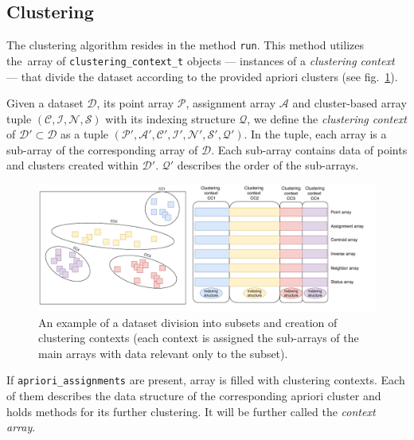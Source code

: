 \subsection{Clustering}
The clustering algorithm resides in the method \texttt{run}. This method utilizes the~array of \texttt{clustering\_context\_t} objects --- instances of a \emph{clustering context} --- that divide the dataset according to the provided apriori clusters (see fig.~\ref{fig03:clust_ctx}).

\begin{defn}
	Given a dataset $\mathcal{D}$, its point array $\mathcal{P}$, assignment array $\mathcal{A}$ and cluster-based array tuple $(\mathcal{C},\mathcal{I},\mathcal{N},\mathcal{S})$ with its indexing structure $\mathcal{Q}$, we define the \emph{clustering context} of $\mathcal{D}' \subset \mathcal{D}$ as a tuple $(\mathcal{P'},\mathcal{A'},\mathcal{C'},\mathcal{I'},\mathcal{N'},\mathcal{S'},\mathcal{Q}')$. In the tuple, each array is a sub-array of the corresponding array of $\mathcal{D}$. Each sub-array contains data of points and clusters created within $\mathcal{D}'$. $\mathcal{Q}'$ describes the order of the sub-arrays.
	\label{def03:context}
\end{defn}

\begin{figure}\centering
	\includegraphics[width=\linewidth]{img/clustering_context}
	\caption{An example of a dataset division into subsets and creation of clustering contexts (each context is assigned the sub-arrays of the main arrays with data relevant only to the subset).}
	\label{fig03:clust_ctx}
\end{figure}

 If \texttt{apriori\_assignments} are present,  array is filled with clustering contexts. Each of them describes the data structure of the corresponding apriori cluster and holds methods for its further clustering. It will be further called the \emph{context array}. 

